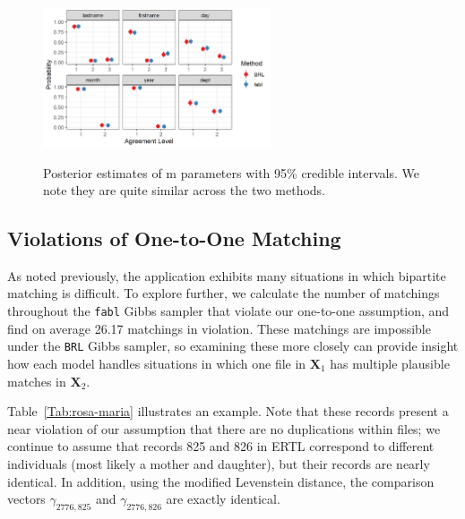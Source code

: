 \documentclass[12pt,letterpaper]{article}
\newcommand{\1}[1]{\mathbb{I}\!\left[#1\right]} %
\begin{document}
\begin{figure}[h!]
\begin{center}
	\includegraphics[width=0.6\textwidth]{../notes/figures/el_salvador/m_posterior_smallP} 
\caption{Posterior estimates of m parameters with 95\% credible intervals. We note they are quite similar across the two methods.}\label{fig:m-and-u}
\label{fig:m-and-u}
\end{center}
\end{figure}

\hypertarget{violations}{%
	\subsection{Violations of One-to-One Matching}\label{violations}}

As noted previously, the application exhibits many situations in which bipartite matching is difficult. To explore further, we calculate the number of matchings throughout the \texttt{fabl} Gibbs sampler that violate our one-to-one assumption, and find on average 26.17 matchings in violation. These matchings are impossible under the \texttt{BRL} Gibbs sampler, so examining these more closely can provide insight how each model handles situations in which one file in $\bm{X}_1$ has
multiple plausible matches in $\bm{X}_2$. 


Table~\ref{Tab:rosa-maria} illustrates an example. Note that these records present a near violation of our assumption that there are no duplications within files; we continue to assume that records 825 and 826 in ERTL correspond to different individuals (most likely a mother and daughter), but their records are nearly identical. In addition, using the modified Levenstein distance, the comparison vectors \(\gamma_{2776, 825}\) and \(\gamma_{2776, 826}\) are exactly identical.
\end{document}
